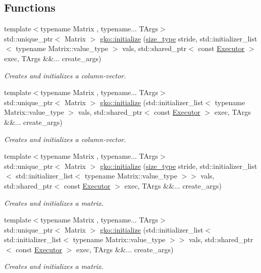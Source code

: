 \subsection*{Functions}
\begin{DoxyCompactItemize}
\item 
{\footnotesize template$<$typename Matrix , typename... T\+Args$>$ }\\std\+::unique\+\_\+ptr$<$ Matrix $>$ \hyperlink{group__LinOp_ga2f54bac1e95fb3ef03974fa9c9088491}{gko\+::initialize} (\hyperlink{namespacegko_a6e5c95df0ae4e47aab2f604a22d98ee7}{size\+\_\+type} stride, std\+::initializer\+\_\+list$<$ typename Matrix\+::value\+\_\+type $>$ vals, std\+::shared\+\_\+ptr$<$ const \hyperlink{classgko_1_1Executor}{Executor} $>$ exec, T\+Args \&\&... create\+\_\+args)
\begin{DoxyCompactList}\small\item\em Creates and initializes a column-\/vector. \end{DoxyCompactList}\item 
{\footnotesize template$<$typename Matrix , typename... T\+Args$>$ }\\std\+::unique\+\_\+ptr$<$ Matrix $>$ \hyperlink{group__LinOp_gaac5f7b4ff3b43dbc6918c687dd7d2d2e}{gko\+::initialize} (std\+::initializer\+\_\+list$<$ typename Matrix\+::value\+\_\+type $>$ vals, std\+::shared\+\_\+ptr$<$ const \hyperlink{classgko_1_1Executor}{Executor} $>$ exec, T\+Args \&\&... create\+\_\+args)
\begin{DoxyCompactList}\small\item\em Creates and initializes a column-\/vector. \end{DoxyCompactList}\item 
{\footnotesize template$<$typename Matrix , typename... T\+Args$>$ }\\std\+::unique\+\_\+ptr$<$ Matrix $>$ \hyperlink{group__LinOp_gaaf2520e5921e1bea00853c290f4fc28f}{gko\+::initialize} (\hyperlink{namespacegko_a6e5c95df0ae4e47aab2f604a22d98ee7}{size\+\_\+type} stride, std\+::initializer\+\_\+list$<$ std\+::initializer\+\_\+list$<$ typename Matrix\+::value\+\_\+type $>$$>$ vals, std\+::shared\+\_\+ptr$<$ const \hyperlink{classgko_1_1Executor}{Executor} $>$ exec, T\+Args \&\&... create\+\_\+args)
\begin{DoxyCompactList}\small\item\em Creates and initializes a matrix. \end{DoxyCompactList}\item 
{\footnotesize template$<$typename Matrix , typename... T\+Args$>$ }\\std\+::unique\+\_\+ptr$<$ Matrix $>$ \hyperlink{group__LinOp_gabe4ff67be5b3aae4e981b33ea9883385}{gko\+::initialize} (std\+::initializer\+\_\+list$<$ std\+::initializer\+\_\+list$<$ typename Matrix\+::value\+\_\+type $>$$>$ vals, std\+::shared\+\_\+ptr$<$ const \hyperlink{classgko_1_1Executor}{Executor} $>$ exec, T\+Args \&\&... create\+\_\+args)
\begin{DoxyCompactList}\small\item\em Creates and initializes a matrix. \end{DoxyCompactList}\end{DoxyCompactItemize}


